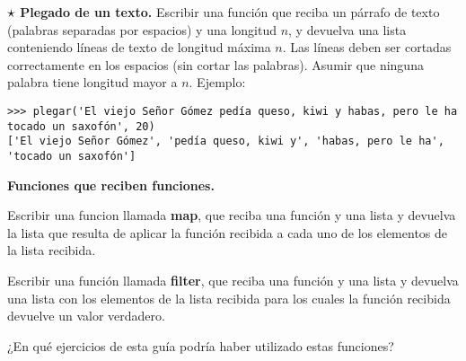 \begin{ejercicio}
$\dificil$ {\bf Plegado de un texto.} Escribir una función que reciba un
párrafo de texto (palabras separadas por espacios) y una longitud $n$, y
devuelva una lista conteniendo líneas de texto de longitud máxima $n$. Las
líneas deben ser cortadas correctamente en los espacios (sin cortar las
palabras). Asumir que ninguna palabra tiene longitud mayor a $n$. Ejemplo:

\begin{lstlisting}[numbers=none]
>>> plegar('El viejo Señor Gómez pedía queso, kiwi y habas, pero le ha tocado un saxofón', 20)
['El viejo Señor Gómez', 'pedía queso, kiwi y', 'habas, pero le ha', 'tocado un saxofón']
\end{lstlisting}
\end{ejercicio}


\begin{ejercicio}
{\bf Funciones que reciben funciones.}
\begin{partes}
\item Escribir una funcion llamada {\bf map}, que reciba una función y una
lista y devuelva la lista que resulta de aplicar la función recibida a
cada uno de los elementos de la lista recibida.
\item Escribir una función llamada {\bf filter}, que reciba una función y
una lista y devuelva una lista con los elementos de la lista recibida para
los cuales la función recibida devuelve un valor verdadero.
\item ¿En qué ejercicios de esta guía podría haber utilizado estas
funciones?
\end{partes}
\end{ejercicio}

